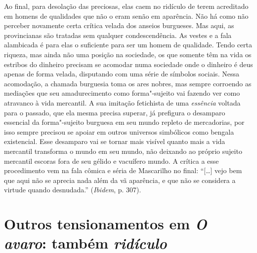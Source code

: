 Ao final, para desolação das preciosas, elas caem no ridículo de terem
acreditado em homens de qualidades que não o eram senão em aparência.
Não há como não perceber novamente certa crítica velada dos anseios
burgueses. Mas aqui, as provincianas são tratadas sem qualquer
condescendência. As vestes e a fala alambicada é para elas o suficiente
para ser um homem de qualidade. Tendo certa riqueza, mas ainda não uma
posição na sociedade, os que somente têm na vida os estribos do dinheiro
precisam se acomodar numa sociedade onde o dinheiro é deus apenas de
forma velada, disputando com uma série de símbolos sociais. Nessa
acomodação, a chamada burguesia toma os ares nobres, mas sempre
corroendo as mediações que seu amadurecimento como forma"-sujeito vai
fazendo ver como atravanco à vida mercantil. A sua imitação fetichista
de uma \emph{essência} voltada para o passado, que ela mesma precisa
superar, já prefigura o desamparo essencial da forma"-sujeito burguesa em
seu mundo repleto de mercadorias, por isso sempre precisou se apoiar em
outros universos simbólicos como bengala existencial. Esse desamparo vai
se tornar mais visível quanto mais a vida mercantil transforma o mundo
em seu mundo, não deixando ao próprio sujeito mercantil escoras fora de
seu gélido e vacuífero mundo. A crítica a esse procedimento vem na fala cômica e séria de
Mascarilho no final: ``[\ldots{}] vejo bem que aqui não se aprecia nada
além da vã aparência, e que não se considera a virtude quando
desnudada.'' (\emph{Ibidem}, p. 307).

\section*{Outros tensionamentos em \emph{O avaro}: também \emph{ridículo}}


